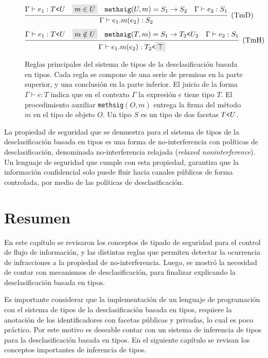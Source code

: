 \begin{figure}[ht]
  \centering
  \[
    \infer[(\text{TmD})]
    {\Gamma \vdash e_1.m(e_2) : S_2}
    {
    \Gamma \vdash e_1 : T\text{\texttt{<}}U&
    \highlight{m\in U}&
    \mathtt{methsig}(U,m) = S_1 \rightarrow S_2&
    \Gamma \vdash e_2 : S_1
    }
  \]
  \[
    \infer[(\text{TmH})]
    {\Gamma \vdash e_1.m(e_2) : T_2\text{\texttt{<}}\highlight{\top}}
    {
    \Gamma \vdash e_1 : T\text{\texttt{<}}U&
    \highlight{m\notin U}&
    \mathtt{methsig}(T,m) = S_1 \rightarrow T_2\text{\texttt{<}}U_2&
    \Gamma \vdash e_2 : S_1
    }
  \]
  \caption{Reglas principales del sistema de tipos de la desclasificación basada en tipos. Cada regla se compone de una serie de premisas en la parte superior, y una conclusión en la parte inferior. El juicio de la forma $\Gamma \vdash e : T$ indica que en el contexto $\Gamma$ la expresión $e$ tiene tipo $T$. El procedimiento auxiliar \texttt{methsig}$(O,m)$ entrega la firma del método $m$ en el tipo de objeto $O$. Un tipo $S$ es un tipo de dos facetas $T\text{\texttt{<}}U$.}
  \label{reglas}
\end{figure}

La propiedad de seguridad que se demuestra para el sistema de tipos de la desclasificación basada en tipos es una forma de no-interferencia con políticas de desclasificación, denominada no-interferencia relajada (\emph{relaxed noninterference}). Un lenguaje de seguridad que cumple con esta propiedad, garantiza que la información confidencial solo puede fluir hacia canales públicos de forma controlada, por medio de las políticas de desclasificación.

\section*{Resumen}
En este capítulo se revisaron los conceptos de tipado de seguridad para el control de flujo de información, y las distintas reglas que permiten detectar la ocurrencia de infracciones a la propiedad de no-interferencia. Luego, se mostró la necesidad de contar con mecanismos de desclasificación, para finalizar explicando la desclasificación basada en tipos.

Es importante considerar que la implementación de un lenguaje de programación con el sistema de tipos de la desclasificación basada en tipos, requiere la anotación de los identificadores con facetas públicas y privadas, lo cual es poco práctico. Por este motivo es deseable contar con un sistema de inferencia de tipos para la desclasificación basada en tipos. En el siguiente capítulo se revisan los conceptos importantes de inferencia de tipos.

